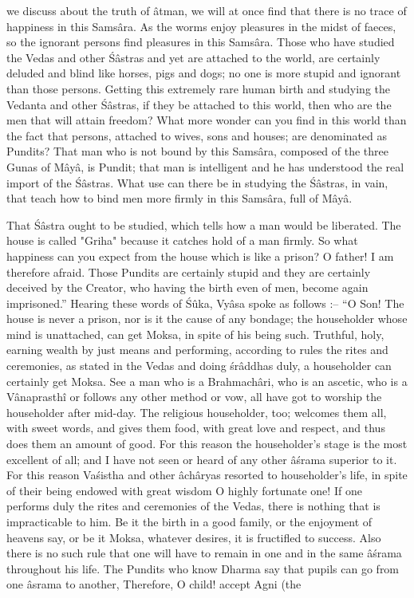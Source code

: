 we discuss about the truth of \^atman, we will at once find that there is no trace of happiness in this Sams\^ara. As the worms enjoy pleasures in the midst of faeces, so the ignorant persons find pleasures in this Sams\^ara. Those who have studied the Vedas and other \'S\^astras and yet are attached to the world, are certainly deluded and blind like horses, pigs and dogs; no one is more stupid and ignorant than those persons. Getting this extremely rare human birth and studying the Vedanta and other \'S\^astras, if they be attached to this world, then who are the men that will attain freedom? What more wonder can you find in this world than the fact that persons, attached to wives, sons and houses; are denominated as Pundits? That man who is not bound by this Sams\^ara, composed of the three Gunas of M\^ay\^a, is Pundit; that man is intelligent and he has understood the real import of the \'S\^astras. What use can there be in studying the \'S\^astras, in vain, that teach how to bind men more firmly in this Sams\^ara, full of M\^ay\^a.

That \'S\^astra ought to be studied, which tells how a man would be liberated. The house is called "Griha" because it catches hold of a man firmly. So what happiness can you expect from the house which is like a prison? O father! I am therefore afraid. Those Pundits are certainly stupid and they are certainly deceived by the Creator, who having the birth even of men, become again imprisoned.'' Hearing these words of \'S\^uka, Vy\^asa spoke as follows :-- ``O Son! The house is never a prison, nor is it the cause of any bondage; the householder whose mind is unattached, can get Moksa, in spite of his being such. Truthful, holy, earning wealth by just means and performing, according to rules the rites and ceremonies, as stated in the Vedas and doing \'sr\^addhas duly, a householder can certainly get Moksa. See a man who is a Brahmach\^ari, who is an ascetic, who is a V\^anaprasth\^i or follows any other method or vow, all have got to worship the householder after mid-day. The religious householder, too; welcomes them all, with sweet words, and gives them food, with great love and respect, and thus does them an amount of good. For this reason the householder's stage is the most excellent of all; and I have not seen or heard of any other \^a\'srama superior to it. For this reason Va\'sistha and other \^ach\^aryas resorted to householder's life, in spite of their being endowed with great wisdom O highly fortunate one! If one performs duly the rites and ceremonies of the Vedas, there is nothing that is impracticable to him. Be it the birth in a good family, or the enjoyment of heavens say, or be it Moksa, whatever desires, it is fructifled to success. Also there is no such rule that one will have to remain in one and in the same \^a\'srama throughout his life. The Pundits who know Dharma say that pupils can go from one \^asrama to another, Therefore, O child! accept Agni (the

